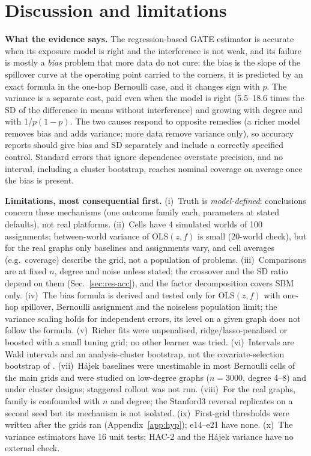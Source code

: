 \section{Discussion and limitations}
\label{sec:limits}
\textbf{What the evidence says.} The regression-based GATE estimator is accurate when its exposure model is right and the interference is not weak, and its failure is mostly a \emph{bias} problem that more data do not cure:
the bias is the slope of the spillover curve at the operating point carried to the corners, it is predicted by an exact formula in the one-hop Bernoulli case, and it changes sign with $p$.
The variance is a separate cost, paid even when the model is right (5.5--18.6 times the SD of the difference in means without interference) and growing with degree and with 1/$p(1-p)$.
The two causes respond to opposite remedies (a richer model removes bias and adds variance; more data remove variance only), so accuracy reports should give bias and SD separately and include a correctly specified control.
Standard errors that ignore dependence overstate precision, and no interval, including a cluster bootstrap, reaches nominal coverage on average once the bias is present.

\textbf{Limitations, most consequential first.} (i)~Truth is \emph{model-defined}: conclusions concern these mechanisms (one outcome family each, parameters at stated defaults), not real platforms. (ii)~Cells have 4 simulated worlds of 100 assignments; between-world variance of OLS$(z,f)$ is small (20-world check), but for the real graphs only baselines and assignments vary, and cell averages (e.g.\ coverage) describe the grid, not a population of problems. (iii)~Comparisons are at fixed $n$, degree and noise unless stated; the crossover and the SD ratio depend on them (Sec.~\ref{sec:res-acc}), and the factor decomposition covers SBM only. (iv)~The bias formula is derived and tested only for OLS$(z,f)$ with one-hop spillover, Bernoulli assignment and the noiseless population limit; the variance scaling holds for independent errors, its level on a given graph does not follow the formula. (v)~Richer fits were unpenalised, ridge/lasso-penalised or boosted with a small tuning grid; no other learner was tried. (vi)~Intervals are Wald intervals and an analysis-cluster bootstrap, not the covariate-selection bootstrap of \citet{hanugander2023}. (vii)~Hájek baselines were unestimable in most Bernoulli cells of the main grids and were studied on low-degree graphs ($n=3000$, degree 4--8) and under cluster designs; staggered rollout was not run. (viii)~For the real graphs, family is confounded with $n$ and degree; the Stanford3 reversal replicates on a second seed but its mechanism is not isolated. (ix)~First-grid thresholds were written after the grids ran (Appendix~\ref{app:hyp}); e14--e21 have none. (x)~The variance estimators have 16 unit tests; HAC-2 and the Hájek variance have no external check.
